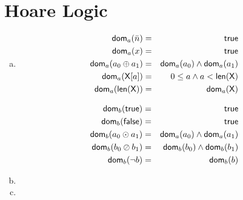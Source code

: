 \section{Hoare Logic}

\newcommand{\dom}{{\sf dom}}

\begin{enumerate}[(a)]
    \item \begin{eqnarray*}
        \dom_a(\bar{n})        & = & {\sf true} \\
        \dom_a(x)              & = & {\sf true} \\
        \dom_a(a_0 \oplus a_1) & = & \dom_a(a_0) \wedge \dom_a(a_1) \\
        \dom_a({\sf X}[a])     & = & 0 \leq a \wedge a < {\sf len(X)} \\
        \dom_a({\sf len(X)})   & = & \dom_a({\sf X})
    \end{eqnarray*}

    \begin{eqnarray*}
        \dom_b({\sf true})      & = & {\sf true} \\
        \dom_b({\sf false})     & = & {\sf true} \\
        \dom_b(a_0 \odot a_1)   & = & \dom_a(a_0) \wedge \dom_a(a_1) \\
        \dom_b(b_0 \oslash b_1) & = & \dom_b(b_0) \wedge \dom_b(b_1) \\
        \dom_b(\neg b)          & = & \dom_b(b) \\
    \end{eqnarray*}

    \item
    \item
\end{enumerate}
